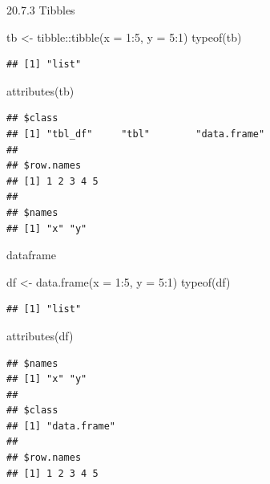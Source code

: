 \documentclass[
  ignorenonframetext,
]{beamer}
\newenvironment{Shaded}{\begin{snugshade}}{\end{snugshade}}
\newcommand{\AttributeTok}[1]{\textcolor[rgb]{0.77,0.63,0.00}{#1}}
\newcommand{\DecValTok}[1]{\textcolor[rgb]{0.00,0.00,0.81}{#1}}
\newcommand{\FunctionTok}[1]{\textcolor[rgb]{0.00,0.00,0.00}{#1}}
\newcommand{\NormalTok}[1]{#1}
\newcommand{\OtherTok}[1]{\textcolor[rgb]{0.56,0.35,0.01}{#1}}
\newcommand{\SpecialCharTok}[1]{\textcolor[rgb]{0.00,0.00,0.00}{#1}}
\begin{document}
\begin{frame}[fragile]{20.7.3 Tibbles}
\protect\hypertarget{tibbles}{}
\begin{Shaded}
\begin{Highlighting}[]
\NormalTok{tb }\OtherTok{\textless{}{-}}\NormalTok{ tibble}\SpecialCharTok{::}\FunctionTok{tibble}\NormalTok{(}\AttributeTok{x =} \DecValTok{1}\SpecialCharTok{:}\DecValTok{5}\NormalTok{, }\AttributeTok{y =} \DecValTok{5}\SpecialCharTok{:}\DecValTok{1}\NormalTok{)}
\FunctionTok{typeof}\NormalTok{(tb)}
\end{Highlighting}
\end{Shaded}

\begin{verbatim}
## [1] "list"
\end{verbatim}

\begin{Shaded}
\begin{Highlighting}[]
\FunctionTok{attributes}\NormalTok{(tb)}
\end{Highlighting}
\end{Shaded}

\begin{verbatim}
## $class
## [1] "tbl_df"     "tbl"        "data.frame"
## 
## $row.names
## [1] 1 2 3 4 5
## 
## $names
## [1] "x" "y"
\end{verbatim}
\end{frame}

\begin{frame}[fragile]{dataframe}
\protect\hypertarget{dataframe}{}
\begin{Shaded}
\begin{Highlighting}[]
\NormalTok{df }\OtherTok{\textless{}{-}} \FunctionTok{data.frame}\NormalTok{(}\AttributeTok{x =} \DecValTok{1}\SpecialCharTok{:}\DecValTok{5}\NormalTok{, }\AttributeTok{y =} \DecValTok{5}\SpecialCharTok{:}\DecValTok{1}\NormalTok{)}
\FunctionTok{typeof}\NormalTok{(df)}
\end{Highlighting}
\end{Shaded}

\begin{verbatim}
## [1] "list"
\end{verbatim}

\begin{Shaded}
\begin{Highlighting}[]
\FunctionTok{attributes}\NormalTok{(df)}
\end{Highlighting}
\end{Shaded}

\begin{verbatim}
## $names
## [1] "x" "y"
## 
## $class
## [1] "data.frame"
## 
## $row.names
## [1] 1 2 3 4 5
\end{verbatim}
\end{frame}
\end{document}
